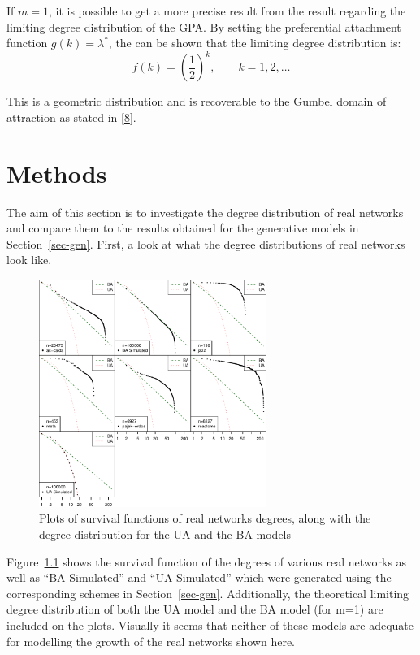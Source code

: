 \documentclass[
  10pt,
  a4paper,
]{scrreprt}
\theoremstyle{definition}
\theoremstyle{plain}
\theoremstyle{plain}
\theoremstyle{remark}
\begin{document}
{If \(m=1\), it is possible to get a more precise result from the result
regarding the limiting degree distribution of the GPA. By setting the
preferential attachment function \(g(k) = \lambda^*\), the can be shown
that the limiting degree distribution is: \[
f(k) = \left(\frac{1}{2} \right)^{k}, \qquad k=1,2,\ldots 
\]

This is a geometric distribution and is recoverable to the Gumbel domain
of attraction as stated in {[}\protect\hyperlink{ref-shimura12}{8}{]}.

\hypertarget{sec-meth}{%
\chapter{Methods}\label{sec-meth}}

The aim of this section is to investigate the degree distribution of
real networks and compare them to the results obtained for the
generative models in Section~\ref{sec-gen}. First, a look at what the
degree distributions of real networks look like.

\begin{figure}[H]

{\centering \includegraphics[width=0.66\textwidth,height=\textheight]{doc_files/figure-pdf/fig-survs-1.pdf}

}

\caption{\label{fig-survs}Plots of survival functions of real networks
degrees, along with the degree distribution for the UA and the BA
models}

\end{figure}

Figure~\ref{fig-survs} shows the survival function of the degrees of
various real networks as well as ``BA Simulated'' and ``UA Simulated''
which were generated using the corresponding schemes in
Section~\ref{sec-gen}. Additionally, the theoretical limiting degree
distribution of both the UA model and the BA model (for m=1) are
included on the plots. Visually it seems that neither of these models
are adequate for modelling the growth of the real networks shown here.

}
\end{document}

